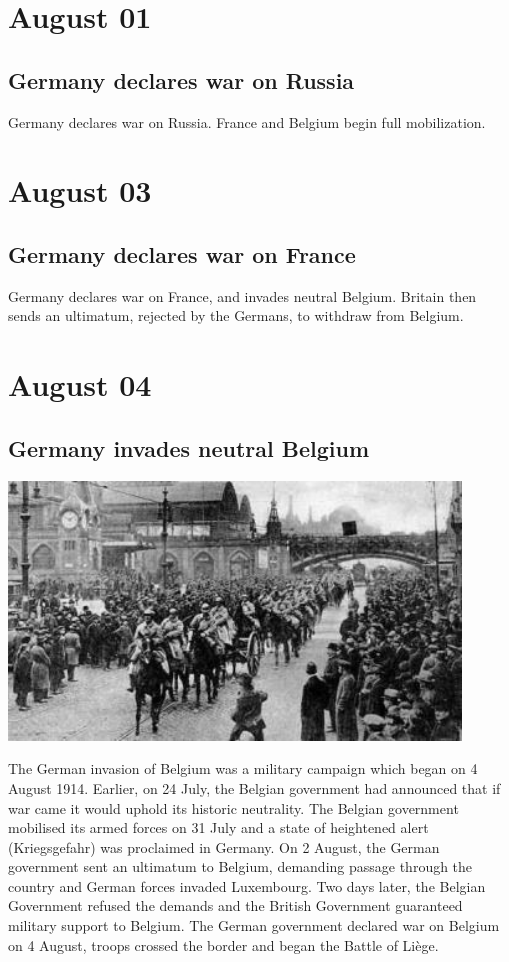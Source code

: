 \documentclass[11pt]{report}
\begin{document}
\section{August 01}
\subsection{Germany declares war on Russia}
Germany declares war on Russia. France and Belgium begin full mobilization.

\section{August 03}
\subsection{Germany declares war on France}
Germany declares war on France, and invades neutral Belgium. Britain then sends an ultimatum, rejected by the Germans, to withdraw from Belgium.

\section{August 04}
\subsection{Germany invades neutral Belgium}
\vspace{2mm}\begin{center}\includegraphics[width=12cm]{./img/germanyInBelgium.jpg}\end{center}
The German invasion of Belgium was a military campaign which began on 4 August 1914. Earlier, on 24 July, the Belgian government had announced that if war came it would uphold its historic neutrality. The Belgian government mobilised its armed forces on 31 July and a state of heightened alert (Kriegsgefahr) was proclaimed in Germany. On 2 August, the German government sent an ultimatum to Belgium, demanding passage through the country and German forces invaded Luxembourg. Two days later, the Belgian Government refused the demands and the British Government guaranteed military support to Belgium. The German government declared war on Belgium on 4 August, troops crossed the border and began the Battle of Liège.
\end{document}
